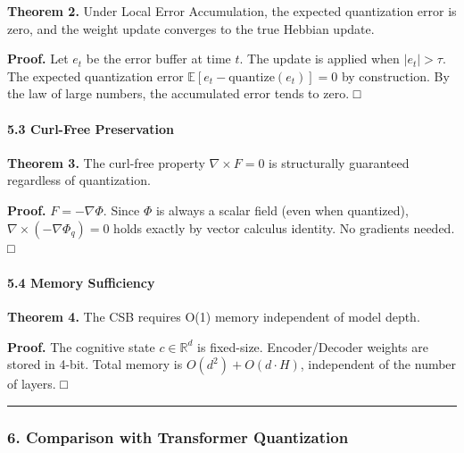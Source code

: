 \documentclass[
  11pt,
  a4paper,
]{article}
\begin{document}
\textbf{Theorem 2.} Under Local Error Accumulation, the expected
quantization error is zero, and the weight update converges to the true
Hebbian update.

\textbf{Proof.} Let \(e_t\) be the error buffer at time \(t\). The
update is applied when \(|e_t| > \tau\). The expected quantization error
\(\mathbb{E}[e_t - \text{quantize}(e_t)] = 0\) by construction. By the
law of large numbers, the accumulated error tends to zero. □

\paragraph{5.3 Curl-Free Preservation}\label{curl-free-preservation}

\textbf{Theorem 3.} The curl-free property \(\nabla \times F = 0\) is
structurally guaranteed regardless of quantization.

\textbf{Proof.} \(F = -\nabla\Phi\). Since \(\Phi\) is always a scalar
field (even when quantized), \(\nabla \times (-\nabla\Phi_q) = 0\) holds
exactly by vector calculus identity. No gradients needed. □

\paragraph{5.4 Memory Sufficiency}\label{memory-sufficiency}

\textbf{Theorem 4.} The CSB requires O(1) memory independent of model
depth.

\textbf{Proof.} The cognitive state \(c \in \mathbb{R}^d\) is
fixed-size. Encoder/Decoder weights are stored in 4-bit. Total memory is
\(O(d^2) + O(d \cdot H)\), independent of the number of layers. □

\begin{center}\rule{0.5\linewidth}{0.5pt}\end{center}

\subsubsection{6. Comparison with Transformer
Quantization}\label{comparison-with-transformer-quantization}
\end{document}
